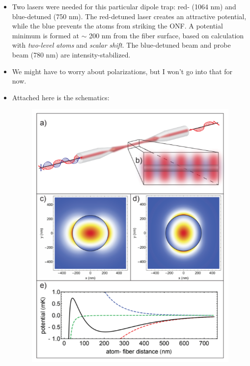 \documentclass{book}
\theoremstyle{definition}
\begin{document}
\begin{itemize}
\begin{itemize}
		\item Two lasers were needed for this particular dipole trap: red- (1064 nm) and blue-detuned (750 nm). The red-detuned laser creates an attractive potential, while the blue prevents the atoms from striking the ONF. A potential minimum is formed at $\sim$ 200 nm from the fiber surface, based on calculation with \textit{two-level atoms} and \textit{scalar shift}. The blue-detuned beam and probe beam (780 nm) are intensity-stabilized. 
		
		\item We might have to worry about polarizations, but I won't go into that for now.
		
		\item Attached here is the schematics:
		\begin{figure}[!htb]
			\centering
			\includegraphics[scale=0.9]{dipole-trap}
		\end{figure}
	

\end{itemize}
\end{itemize}
\end{document}
